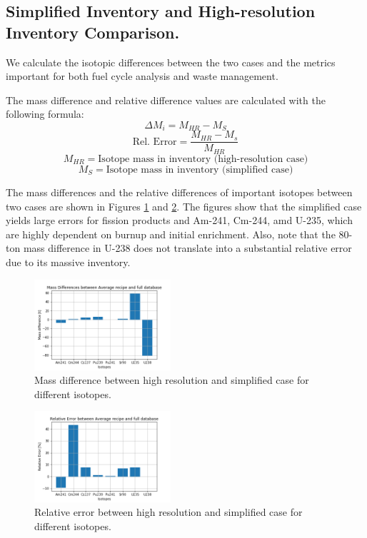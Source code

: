 \documentclass{anstrans}
\begin{document}
\subsection{Simplified Inventory and High-resolution Inventory Comparison.}
We calculate the isotopic differences between the two cases
and the metrics important for both fuel cycle analysis
and waste management.

The mass difference and relative difference values are calculated
with the following formula:
\[\Delta M_i = M_{HR} - M_{S} \]
\[\text{Rel. Error} = \frac{M_{HR} - M_{s}}{M_{HR}}\]
\[M_{HR} = \text{Isotope mass in inventory (high-resolution case)}\]
\[M_{S} = \text{Isotope mass in inventory (simplified case)}\]

The mass differences and the relative differences
of important isotopes between two cases are shown in
Figures \ref{fig:iso_mass} and \ref{fig:iso_rel}. 
The figures show that the simplified case yields
large errors for fission products and Am-241, Cm-244, amd U-235,
which are highly dependent on burnup and initial enrichment.
Also, note that the 80-ton mass difference in U-238 does not
translate into a substantial relative error due to its massive
inventory.

\begin{figure}
    \centering
    \includegraphics[width=0.45\textwidth]{./images/iso_mass.png}
    \caption{Mass difference between high resolution and simplified case for different isotopes.}
    \label{fig:iso_mass}
\end{figure}

\begin{figure}
    \centering
    \includegraphics[width=0.45\textwidth]{./images/iso_rel.png}
    \caption{Relative error between high resolution and simplified case for different isotopes.}
    \label{fig:iso_rel}
\end{figure}
\end{document}
